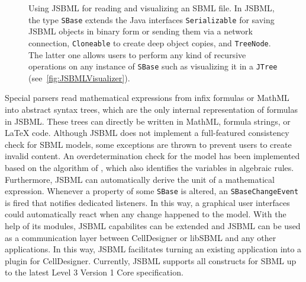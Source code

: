 \documentclass{bioinfo}
\begin{document}
\begin{methods}
\begin{figure}
{{{{\begin{minipage}[t][5.7cm][c]{.55\textwidth}
        \end{minipage}
      }
    }
  }\hspace{1cm}
}
\caption[Using JSBML for reading and visualizing an SBML file using
JSBML]{Using JSBML for reading and visualizing an SBML file. In JSBML, the type
\texttt{SBase} extends the Java interfaces \texttt{Serializable} for saving
JSBML objects in binary form or sending them via a network connection,
\texttt{Cloneable} to create deep object copies, and \texttt{TreeNode}. The
latter one allows users to perform any kind of recursive operations on any
instance of \texttt{SBase} such as visualizing it in a \texttt{JTree}
(see~\ref{fig:JSBMLVisualizer}).}
\label{fig:JSBML}
\end{figure}
Special parsers read mathematical expressions from infix formulas or MathML
into abstract syntax trees, which are the only internal representation
of formulas in JSBML.
These trees can directly be written in MathML, formula strings, or \LaTeX{}
code.
Although JSBML does not implement a full-featured
consistency check for SBML models, some exceptions are thrown to prevent users
to create invalid content. An overdetermination check for the model has been
implemented based on the algorithm of \citet{Hopcroft1973}, which also
identifies the variables in algebraic rules. Furthermore, JSBML can
automatically derive the unit of a mathematical expression.
Whenever a property of some \texttt{SBase} is altered, an
\texttt{SBaseChangeEvent} is fired that notifies dedicated listeners. In this
way, a graphical user interfaces could automatically react when any change
happened to the model. With the help of its modules, JSBML capabilites can be
extended and JSBML can be used as a communication layer between CellDesigner
\citep{Funahashi2003} or libSBML and any other applications. In this way, JSBML
facilitates turning an existing application into a plugin for CellDesigner.
Currently, JSBML supports all constructs for SBML up to the latest Level 3
Version 1 Core specification.
\end{methods}
\end{document}
